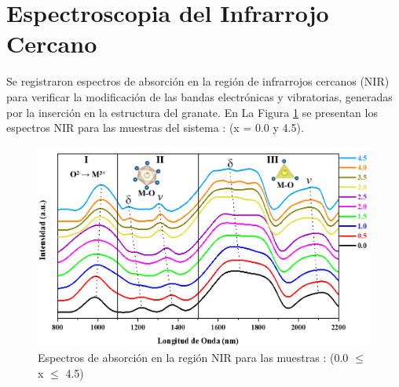 \section{Espectroscopia del Infrarrojo Cercano}

Se registraron espectros de absorción en la región de infrarrojos cercanos
(NIR) para verificar la modificación de las bandas electrónicas y vibratorias,
generadas por la inserción  en la estructura del granate. En La
Figura \ref{fig:nir} se presentan los espectros NIR para las muestras del
sistema
: (x = 0.0 y 4.5).\\

\begin{figure}[h]
    \centering%

    \includegraphics[width=\textwidth]{Kap3/NIR.png}%
    \caption{Espectros de absorción en la región NIR para las muestras
    : (0.0 $\leq$ x $\leq$ 4.5)}
    \label{fig:nir}
\end{figure}

